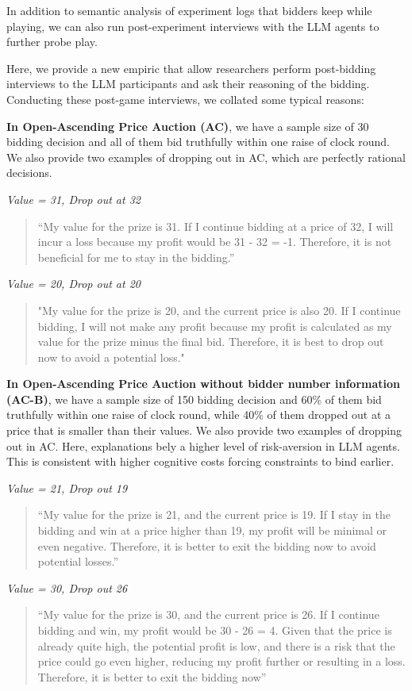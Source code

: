 \documentclass{article} %
\begin{document}
In addition to semantic analysis of experiment logs that bidders keep while playing, we can also run post-experiment interviews with the LLM agents to further probe play.

Here, we provide a new empiric that allow researchers perform post-bidding interviews to the LLM participants and ask their reasoning of the bidding. 
Conducting these post-game interviews, we collated some typical reasons:

\textbf{In Open-Ascending Price Auction (AC)},
 we have a sample size of 30 bidding decision and all of them bid truthfully within one raise of clock round. We also provide two examples of dropping out in AC, which are perfectly rational decisions.

\textit{Value = 31, Drop out at 32}
\begin{quote}
    “My value for the prize is 31. If I continue bidding at a price of 32, I will incur a loss because my profit would be 31 - 32 = -1. Therefore, it is not beneficial for me to stay in the bidding.”
\end{quote}

\textit{Value = 20, Drop out at 20}
\begin{quote}
    "My value for the prize is 20, and the current price is also 20. If I continue bidding, I will not make any profit because my profit is calculated as my value for the prize minus the final bid. Therefore, it is best to drop out now to avoid a potential loss."
\end{quote}

\textbf{In Open-Ascending Price Auction without bidder number information (AC-B)},
 we have a sample size of 150 bidding decision and 60\% of them bid truthfully within one raise of clock round, while 40\% of them dropped out at a price that is smaller than their values. 
 We also provide two examples of dropping out in AC.
 Here, explanations bely a higher level of risk-aversion in LLM agents. 
This is consistent with higher cognitive costs forcing constraints to bind earlier.

\textit{Value = 21,  Drop out 19}
\begin{quote}
    “My value for the prize is 21, and the current price is 19. If I stay in the bidding and win at a price higher than 19, my profit will be minimal or even negative. Therefore, it is better to exit the bidding now to avoid potential losses.”
\end{quote}

\textit{Value = 30,  Drop out 26}
\begin{quote}
“My value for the prize is 30, and the current price is 26. If I continue bidding and win, my profit would be 30 - 26 = 4. Given that the price is already quite high, the potential profit is low, and there is a risk that the price could go even higher, reducing my profit further or resulting in a loss. Therefore, it is better to exit the bidding now”
\end{quote}
\end{document}
